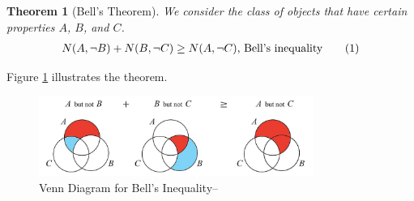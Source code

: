 \documentclass[]{article}
\newcommand\numberthis{\addtocounter{equation}{1}\tag{\theequation}}
\newtheorem{thm}{Theorem}
\begin{document}
\begin{thm}[Bell's Theorem]
We consider the class of objects that have certain properties $A$, $B$, and $C$.
	\begin{align*}
		N(A, \neg B) + N(B, \neg C) \ge N(A,\neg C)\text{,  Bell's inequality} \numberthis \label{eq:bell:inequality}
	\end{align*}
\end{thm}

Figure \ref{fig:bell} illustrates the theorem.
\begin{figure}[H]
	\caption{Venn Diagram for Bell's Inequality--\cite{wiki2020bell}}\label{fig:bell}
	\includegraphics[width=0.8\textwidth]{1200px-Bell's_Theorem_JCB.jpg}
\end{figure}
\end{document}
